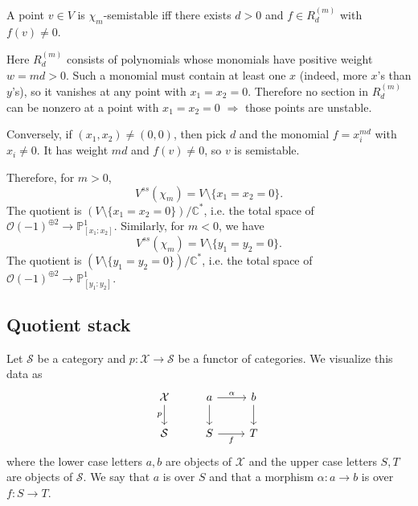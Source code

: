 \documentclass[12pt]{article}
\begin{document}
A point $v\in V$ is $\chi_m$-semistable iff there exists $d>0$ and $f\in R^{(m)}_d$ with $f(v)\ne 0$.

Here $R^{(m)}_d$ consists of polynomials whose monomials have positive weight $w=md>0$. Such a monomial must contain at least one $x$ (indeed, more $x$'s than $y$'s), so it vanishes at any point with $x_1=x_2=0$. Therefore no section in $R^{(m)}_d$ can be nonzero at a point with $x_1=x_2=0$ $\Rightarrow$ those points are unstable.

Conversely, if $(x_1,x_2)\neq(0,0)$, then pick $d$ and the monomial
$f=x_i^{md}$ with $x_i\neq 0$. It has weight $md$ and $f(v)\neq 0$, so $v$ is semistable.

Therefore, for $m>0$,
\[
  V^{ss}(\chi_m)=V\setminus\{x_1=x_2=0\}.
\]
The quotient is $(V\setminus\{x_1=x_2=0\})/\mathbb{C}^*$, i.e. the total space of $\mathcal{O}(-1)^{\oplus 2}\to\mathbb{P}^1_{[x_1:x_2]}$. Similarly, for $m<0$, we have
\[
  V^{ss}(\chi_m)=V\setminus\{y_1=y_2=0\}.
\]
The quotient is $(V\setminus\{y_1=y_2=0\})/\mathbb{C}^*$, i.e. the total space of $\mathcal{O}(-1)^{\oplus 2}\to\mathbb{P}^1_{[y_1:y_2]}$.

\subsection{Quotient stack}
Let $\mathcal{S}$ be a category and $p:\mathcal{X}\to\mathcal{S}$ be a functor of categories.
We visualize this data as
\[
  \begin{tikzcd}
    \mathcal{X} \arrow[d, "p"'] & a \arrow[r, "\alpha"] \arrow[d] & b \arrow[d] \\
    \mathcal{S} & S \arrow[r, "f"'] & T
  \end{tikzcd}
\]
where the lower case letters $a,b$ are objects of $\mathcal{X}$ and the upper case letters $S,T$
are objects of $\mathcal{S}$. We say that $a$ is over $S$ and that a morphism $\alpha: a\to b$ is
over $f:S\to T$.
\end{document}
